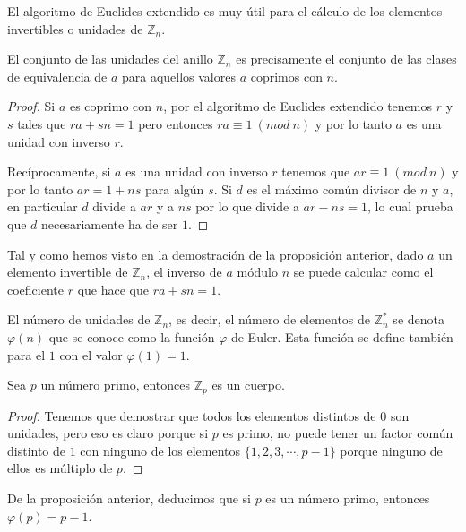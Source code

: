 El algoritmo de Euclides extendido es muy \'util para el c\'alculo de los elementos invertibles o unidades de ${\mathbb Z}_n$.

\begin{proposition}
El conjunto de las unidades del anillo ${\mathbb Z}_n$ es precisamente el
conjunto de las clases de equivalencia de $a$ para aquellos valores $a$ coprimos con $n$.
\end{proposition}
\begin{proof}
Si $a$ es coprimo con $n$, por el algoritmo de Euclides extendido tenemos $r$ y
$s$ tales que $ra+sn = 1$ pero entonces $ra \equiv 1 ~(mod~n)$ y por lo tanto
$a$ es una unidad con inverso $r$.

Rec\'iprocamente, si $a$ es una unidad con inverso $r$ tenemos que $ar \equiv
1~(mod~n)$ y por lo tanto $ar = 1 + ns$ para alg\'un $s$. Si $d$ es el m\'aximo
com\'un divisor de $n$ y $a$, en particular $d$ divide a $ar$ y a $ns$ por lo
que divide a $ar-ns = 1$, lo cual prueba que $d$ necesariamente ha de ser $1$.
\end{proof}

\begin{remark}
Tal y como hemos visto en la demostraci\'on de la proposici\'on anterior,
dado $a$ un elemento invertible de ${\mathbb Z}_n$, el inverso de $a$ m\'odulo
$n$ se puede calcular como el coeficiente $r$ que hace que $ra+sn=1$.
\end{remark}

\begin{definition}
El n\'umero de unidades de ${\mathbb Z}_n$, es decir, el n\'umero de elementos de
${\mathbb Z}_n^*$ se denota $\varphi(n)$ que se conoce como la funci\'on
$\varphi$ de Euler. Esta funci\'on se define tambi\'en para el $1$ con el
valor $\varphi(1) = 1$.
\end{definition}

\begin{proposition}
Sea $p$ un n\'umero primo, entonces ${\mathbb Z}_p$ es un cuerpo.
\end{proposition}
\begin{proof}
Tenemos que demostrar que todos los elementos distintos de $0$ son unidades,
pero eso es claro porque si $p$ es primo, no puede tener un factor com\'un distinto de $1$ con ninguno de los elementos $\{1,2,3,\cdots,p-1\}$ porque ninguno de ellos es m\'ultiplo de $p$.
\end{proof}

\begin{remark}
De la proposici\'on anterior, deducimos que si $p$ es un n\'umero primo, entonces $\varphi(p) = p-1$.
\end{remark}


